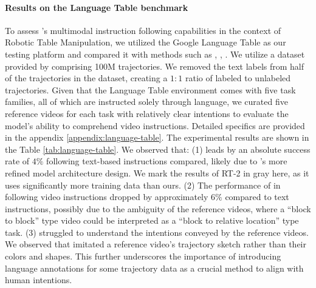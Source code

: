 \paragraph{Results on the Language Table benchmark} To assess \agent's multimodal instruction following capabilities in the context of Robotic Table Manipulation, we utilized the Google Language Table as our testing platform and compared it with methods such as  \citep{language_table},  \citep{rt-1},  \citep{groot1}. We utilize a dataset provided by \cite{language_table} comprising 100M trajectories. We removed the text labels from half of the trajectories in the dataset, creating a $1:1$ ratio of labeled to unlabeled trajectories. Given that the Language Table environment comes with five task families, all of which are instructed solely through language, we curated five reference videos for each task with relatively clear intentions to evaluate the model's ability to comprehend video instructions. Detailed specifics are provided in the appendix \ref{appendix:language-table}. 
The experimental results are shown in the Table \ref{tab:language-table}. We observed that: (1) \agent leads by an absolute success rate of $4\%$ following text-based instructions compared, likely due to \agent's more refined model architecture design. We mark the results of RT-2 in gray here, as it uses significantly more training data than ours. (2) The performance of \agent in following video instructions dropped by approximately $6\%$ compared to text instructions, possibly due to the ambiguity of the reference videos, where a ``block to block'' type video could be interpreted as a ``block to relative location'' type task. (3)  struggled to understand the intentions conveyed by the reference videos. We observed that  imitated a reference video's trajectory sketch rather than their colors and shapes. This further underscores the importance of introducing language annotations for some trajectory data as a crucial method to align with human intentions. 


